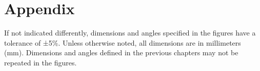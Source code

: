 \documentclass[a4paper]{report}
\begin{document}
{{%
%
%

 
\appendix
\chapter{Appendix}
If not indicated differently, dimensions and angles specified in the figures have a tolerance of
±5\%. Unless otherwise noted, all dimensions are in millimeters (mm).
Dimensions and angles defined in the previous chapters may not be repeated in the figures.

}}
\end{document}
